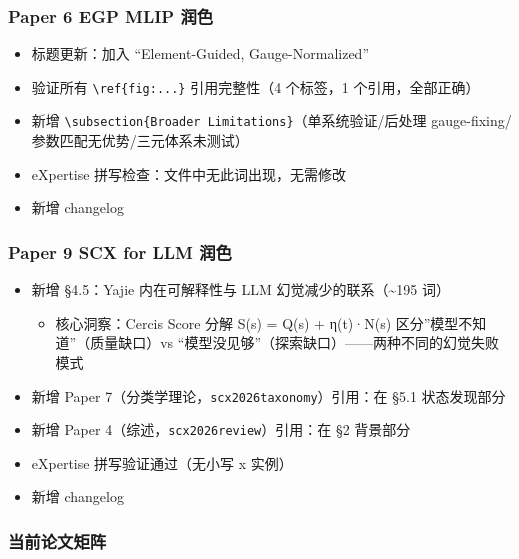 \documentclass[
  12pt,
]{ctexart}
\providecommand{\tightlist}{%
  \setlength{\itemsep}{0pt}\setlength{\parskip}{0pt}}
\begin{document}
\subsubsection{Paper 6 EGP MLIP
润色}\label{paper-6-egp-mlip-ux6da6ux8272}

\begin{itemize}
\tightlist
\item
  标题更新：加入 ``Element-Guided, Gauge-Normalized''
\item
  验证所有 \texttt{\textbackslash{}ref\{fig:...\}} 引用完整性（4
  个标签，1 个引用，全部正确）
\item
  新增
  \texttt{\textbackslash{}subsection\{Broader\ Limitations\}}（单系统验证/后处理
  gauge-fixing/参数匹配无优势/三元体系未测试）
\item
  eXpertise 拼写检查：文件中无此词出现，无需修改
\item
  新增 changelog
\end{itemize}

\subsubsection{Paper 9 SCX for LLM
润色}\label{paper-9-scx-for-llm-ux6da6ux8272}

\begin{itemize}
\tightlist
\item
  新增 §4.5：Yajie 内在可解释性与 LLM 幻觉减少的联系（\textasciitilde195
  词）

  \begin{itemize}
  \tightlist
  \item
    核心洞察：Cercis Score 分解 S(s) = Q(s) + η(t)·N(s)
    区分''模型不知道''（质量缺口）vs
    ``模型没见够''（探索缺口）------两种不同的幻觉失败模式
  \end{itemize}
\item
  新增 Paper 7（分类学理论，\texttt{scx2026taxonomy}）引用：在 §5.1
  状态发现部分
\item
  新增 Paper 4（综述，\texttt{scx2026review}）引用：在 §2 背景部分
\item
  eXpertise 拼写验证通过（无小写 x 实例）
\item
  新增 changelog
\end{itemize}

\subsubsection{当前论文矩阵}\label{ux5f53ux524dux8bbaux6587ux77e9ux9635}
\end{document}
